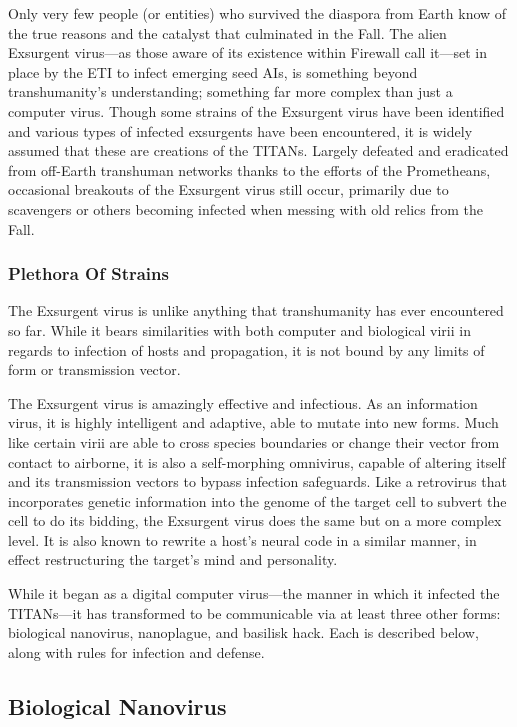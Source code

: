 Only very few people (or entities) who survived the 
diaspora from Earth know of the true reasons and 
the catalyst that culminated in the Fall. The alien Exsurgent
virus—as those aware of its existence within
Firewall call it—set in place by the ETI to infect 
emerging seed AIs, is something beyond transhumanity's
understanding; something far more complex
than just a computer virus. Though some strains of 
the Exsurgent virus have been identified and various 
types of infected exsurgents have been encountered, 
it is widely assumed that these are creations of the 
TITANs. Largely defeated and eradicated from off-Earth
transhuman networks thanks to the efforts of
the Prometheans, occasional breakouts of the Exsurgent
virus still occur, primarily due to scavengers or
others becoming infected when messing with old relics 
from the Fall.

\subsubsection{Plethora Of Strains }

The Exsurgent virus is unlike anything that transhumanity
has ever encountered so far. While it bears
similarities with both computer and biological virii in 
regards to infection of hosts and propagation, it is not 
bound by any limits of form or transmission vector. 

The Exsurgent virus is amazingly effective and 
infectious. As an information virus, it is highly intelligent
and adaptive, able to mutate into new forms.
Much like certain virii are able to cross species 
boundaries or change their vector from contact to 
airborne, it is also a self-morphing omnivirus, capable
of altering itself and its transmission vectors
to bypass infection safeguards. Like a retrovirus that 
incorporates genetic information into the genome of 
the target cell to subvert the cell to do its bidding, the 
Exsurgent virus does the same but on a more complex
level. It is also known to rewrite a host's neural
code in a similar manner, in effect restructuring the 
target's mind and personality.

While it began as a digital computer virus—the 
manner in which it infected the TITANs—it has transformed
to be communicable via at least three other
forms: biological nanovirus, nanoplague, and basilisk 
hack. Each is described below, along with rules for 
infection and defense.

\subsection{Biological Nanovirus}

